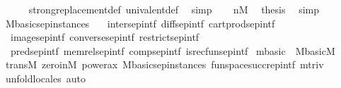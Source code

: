 \begin{isabellebody}
\ \ \ \ \isamarkupfalse%
\ strong{\isacharunderscore}{\kern0pt}replacement{\isacharunderscore}{\kern0pt}def\ univalent{\isacharunderscore}{\kern0pt}def\ \isamarkupfalse%
\ simp\isanewline
\ \ \isamarkupfalse%
\ {\isacartoucheopen}n{\isasymin}M{\isacartoucheclose}\ \isamarkupfalse%
\ {\isacharquery}{\kern0pt}thesis\ \isamarkupfalse%
\ simp\isanewline
{}\isamarkupfalse%
%
\endisatagproof
{\isafoldproof}%
%
\isadelimproof
\isanewline
%
\endisadelimproof
\isanewline
\isanewline
\isanewline
\isanewline
{}\isamarkupfalse%
\ M{\isacharunderscore}{\kern0pt}basic{\isacharunderscore}{\kern0pt}sep{\isacharunderscore}{\kern0pt}instances\ {\isacharequal}{\kern0pt}\isanewline
\ \ inter{\isacharunderscore}{\kern0pt}sep{\isacharunderscore}{\kern0pt}intf\ diff{\isacharunderscore}{\kern0pt}sep{\isacharunderscore}{\kern0pt}intf\ cartprod{\isacharunderscore}{\kern0pt}sep{\isacharunderscore}{\kern0pt}intf\isanewline
\ \ image{\isacharunderscore}{\kern0pt}sep{\isacharunderscore}{\kern0pt}intf\ converse{\isacharunderscore}{\kern0pt}sep{\isacharunderscore}{\kern0pt}intf\ restrict{\isacharunderscore}{\kern0pt}sep{\isacharunderscore}{\kern0pt}intf\isanewline
\ \ pred{\isacharunderscore}{\kern0pt}sep{\isacharunderscore}{\kern0pt}intf\ memrel{\isacharunderscore}{\kern0pt}sep{\isacharunderscore}{\kern0pt}intf\ comp{\isacharunderscore}{\kern0pt}sep{\isacharunderscore}{\kern0pt}intf\ is{\isacharunderscore}{\kern0pt}recfun{\isacharunderscore}{\kern0pt}sep{\isacharunderscore}{\kern0pt}intf\isanewline
\isanewline
{}\isamarkupfalse%
\ mbasic\ {\isacharcolon}{\kern0pt}\ {\isachardoublequoteopen}M{\isacharunderscore}{\kern0pt}basic{\isacharparenleft}{\kern0pt}{\isacharhash}{\kern0pt}{\isacharhash}{\kern0pt}M{\isacharparenright}{\kern0pt}{\isachardoublequoteclose}\isanewline
%
\isadelimproof
\ \ %
\endisadelimproof
%
\isatagproof
{}\isamarkupfalse%
\ trans{\isacharunderscore}{\kern0pt}M\ zero{\isacharunderscore}{\kern0pt}in{\isacharunderscore}{\kern0pt}M\ power{\isacharunderscore}{\kern0pt}ax\ M{\isacharunderscore}{\kern0pt}basic{\isacharunderscore}{\kern0pt}sep{\isacharunderscore}{\kern0pt}instances\ funspace{\isacharunderscore}{\kern0pt}succ{\isacharunderscore}{\kern0pt}rep{\isacharunderscore}{\kern0pt}intf\ mtriv\isanewline
\ \ \isamarkupfalse%
\ unfold{\isacharunderscore}{\kern0pt}locales\ auto%
\endisatagproof
{\isafoldproof}%
%
\isadelimproof
\isanewline
%
\endisadelimproof
\isanewline
{}\isamarkupfalse%
\isanewline

\end{isabellebody}
